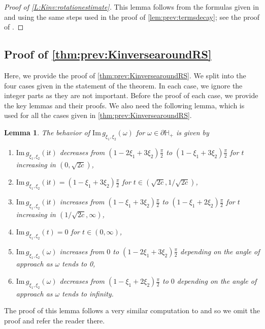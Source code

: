 \documentclass[11pt,twoside]{amsart}
\theoremstyle{plain}
\newtheorem{lem}[thm]{Lemma}
\numberwithin{quest}{section}
\theoremstyle{remark}
\numberwithin{rem}{section}
\theoremstyle{definition}
\begin{document}
	
	\begin{proof}[Proof of \cref{L:Kinv:rotationestimate}]
		This lemma follows from the formulas given in \cite[Corollary 2.4]{CJ16} and using the same steps used in the proof of \cref{lem:prev:termsdecay}; see the proof of \cite[Lemma 3.6]{CJ16}.
	\end{proof}
	
	
	
	\subsection{Proof of \cref{thm:prev:KinversearoundRS}}
    \label{subsec:thm:KinversearoundRS}
	
	Here, we provide the proof of \cref{thm:prev:KinversearoundRS}.  We split into the four cases given in the statement of the theorem.  In each case, we ignore the integer parts as they are not important.  Before the proof of each case, we provide the key lemmas and their proofs. We also need the following lemma, which is used for all the cases given in \cref{thm:prev:KinversearoundRS}. 
	
	\begin{lem} \label{asym:lem:imaginary}
		The behavior of  $\mathrm{Im}\, g_{\xi_1,\xi_2} (\omega)$ for $\omega \in \partial \mathbb{H}_+$ is given by
		\begin{enumerate}
			\item $\mathrm{Im}\, g_{\xi_1,\xi_2} ( \mathrm{i}t)$ decreases from $(1-2\xi_1+3 \xi_2) \frac{\pi}{2}$ to $(1-\xi_1+3\xi_2 ) \frac{\pi}{2}$ for $t$ increasing in $(0,\sqrt{2c})$,
			\item $\mathrm{Im}\, g_{\xi_1,\xi_2} ( \mathrm{i}t)=(1-\xi_1+3\xi_2) \frac{\pi}{2}$ for $t \in(\sqrt{2c},1/\sqrt{2c})$,
			\item $\mathrm{Im}\, g_{\xi_1,\xi_2} ( \mathrm{i}t)$ increases from $(1-\xi_1+3\xi_2 ) \frac{\pi}{2}$ to $(1 -\xi_1+2\xi_2) \frac{\pi}{2}$ for $t$ increasing in $(1/\sqrt{2c},\infty)$,
			\item $\mathrm{Im}\, g_{\xi_1,\xi_2} ( t)= 0$ for $t \in (0,\infty)$,
			\item  $\mathrm{Im}\, g_{\xi_1,\xi_2} (\omega)$ increases from $0$ to $(1-2\xi_1+3\xi_2 ) \frac{\pi}{2}$  depending on the angle of approach as $\omega$ tends to 0,
			\item  $\mathrm{Im}\, g_{\xi_1,\xi_2} (\omega)$ decreases from $(1-\xi_1+2\xi_2 ) \frac{\pi}{2}$  to $0$ depending on the angle of approach as $\omega$ tends to infinity. 
			
		\end{enumerate}
		
	\end{lem}
	The proof of this lemma follows a very similar computation to \cite[Lemma 3.8]{CJ16}  and so we omit the proof and refer the reader there.  
	
\end{document}
